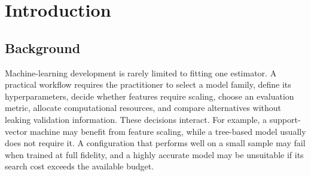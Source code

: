 \documentclass[12pt,a4paper,oneside]{report}
\newcommand{\systemname}{Accelera AutoML}
\begin{document}
\begin{abstract}
\normalsize
\noindent
Selecting an appropriate machine-learning pipeline, including data preprocessing,
algorithm selection, and hyperparameter optimization, is a complex and
computationally expensive process. This thesis presents \systemname{}, an
automated machine-learning (AutoML) module integrated into the Accelera
framework. The proposed module provides a unified scikit-learn-style interface
for both classification and regression tasks while automating the construction
and optimization of machine-learning pipelines.

\medskip

\noindent
To efficiently explore the search space, \systemname{} combines conditional
configuration spaces, cross-validated model evaluation, multi-fidelity
optimization, and Bayesian optimization using a random-forest surrogate model
with an expected-improvement acquisition function. The system further
incorporates meta-learning warm starts, timeout-based isolation of candidate
evaluations, and ensemble construction through voting and stacking techniques.

\medskip

\noindent
This thesis describes the design, architecture, implementation, and evaluation
of \systemname{}, demonstrating how these components can be integrated into a
practical AutoML system that reduces manual effort while producing competitive
machine-learning models.
\end{abstract}

\clearpage
\tableofcontents
\listoftables
\clearpage

\chapter{Introduction}
\label{chap:introduction}

\section{Background}

Machine-learning development is rarely limited to fitting one estimator. A
practical workflow requires the practitioner to select a model family, define
its hyperparameters, decide whether features require scaling, choose an
evaluation metric, allocate computational resources, and compare alternatives
without leaking validation information. These decisions interact. For
example, a support-vector machine may benefit from feature scaling, while a
tree-based model usually does not require it. A configuration that performs
well on a small sample may fail when trained at full fidelity, and a highly
accurate model may be unsuitable if its search cost exceeds the available
budget.
\end{document}
